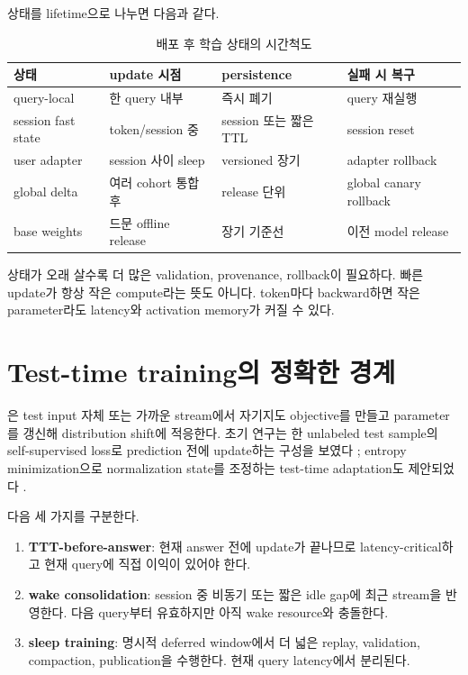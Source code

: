 상태를 lifetime으로 나누면 다음과 같다.

\begin{table}[htbp]
\centering
\caption{배포 후 학습 상태의 시간척도}
\label{tab:bg-state-timescale}
\small
\begin{tabularx}{\textwidth}{p{} X X X}
\toprule
상태 & update 시점 & persistence & 실패 시 복구 \\
\midrule
query-local & 한 query 내부 & 즉시 폐기 & query 재실행 \\
session fast state & token/session 중 & session 또는 짧은 TTL & session reset \\
user adapter & session 사이 sleep & versioned 장기 & adapter rollback \\
global delta & 여러 cohort 통합 후 & release 단위 & global canary rollback \\
base weights & 드문 offline release & 장기 기준선 & 이전 model release \\
\bottomrule
\end{tabularx}
\end{table}

상태가 오래 살수록 더 많은 validation, provenance, rollback이 필요하다. 빠른 update가 항상 작은
compute라는 뜻도 아니다. token마다 backward하면 작은 parameter라도 latency와 activation memory가
커질 수 있다.

\section{Test-time training의 정확한 경계}

은 test input 자체 또는 가까운 stream에서 자기지도
objective를 만들고 parameter를 갱신해 distribution shift에 적응한다. 초기 연구는 한 unlabeled test
sample의 self-supervised loss로 prediction 전에 update하는 구성을 보였다
\parencite{sun2020ttt}; entropy minimization으로 normalization state를 조정하는 test-time adaptation도
제안되었다 \parencite{wang2021tent}.

다음 세 가지를 구분한다.

\begin{enumerate}
  \item \textbf{TTT-before-answer}: 현재 answer 전에 update가 끝나므로 latency-critical하고 현재 query에
        직접 이익이 있어야 한다.
  \item \textbf{wake consolidation}: session 중 비동기 또는 짧은 idle gap에 최근 stream을 반영한다.
        다음 query부터 유효하지만 아직 wake resource와 충돌한다.
  \item \textbf{sleep training}: 명시적 deferred window에서 더 넓은 replay, validation, compaction,
        publication을 수행한다. 현재 query latency에서 분리된다.
\end{enumerate}

